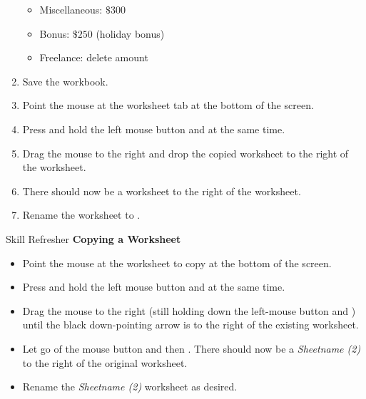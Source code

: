 \begin{enumbox}
\begin{enumerate}
		\begin{itemize}
			\item Miscellaneous: $ \$300 $
			\item Bonus: $ \$250 $ (holiday bonus)
			\item Freelance: delete amount
		\end{itemize}
		\item Save the  workbook.
		\item Point the mouse at the  worksheet tab at the bottom of the screen.
		\item Press and hold the left mouse button and  at the same time. 
		\item Drag the mouse to the right and drop the copied worksheet to the right of the  worksheet.
		\item There should now be a  worksheet to the right of the  worksheet.
		\item Rename the  worksheet to .
	\end{enumerate}
\end{enumbox}

\begin{center}
	\begin{sklbox}{Skill Refresher}
		\textbf{Copying a Worksheet}
		\\
		\begin{itemize}
			\setlength{\itemsep}{0pt}
			\setlength{\parskip}{0pt}
			\setlength{\parsep}{0pt}
			
			\item Point the mouse at the worksheet to copy at the bottom of the screen.
			\item Press and hold the left mouse button and  at the same time.
			\item Drag the mouse to the right (still holding down the left-mouse button and ) until the black down-pointing arrow is to the right of the existing worksheet.
			\item Let go of the mouse button and then . There should now be a \textit{Sheetname (2)} to the right of the original worksheet.
			\item Rename the \textit{Sheetname (2)} worksheet as desired.
			
		\end{itemize}
	\end{sklbox}
\end{center}

